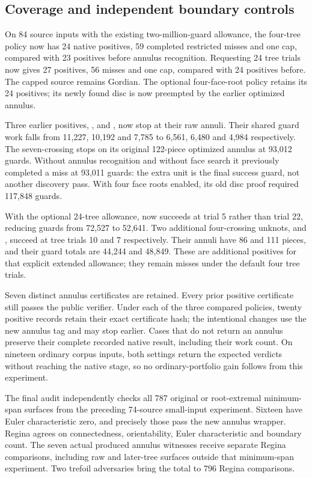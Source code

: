 \subsection{Coverage and independent boundary controls}

On 84 source inputs with the existing two-million-guard allowance, the
four-tree policy now has 24 native positives, 59 completed restricted
misses and one cap, compared with 23 positives before annulus recognition.
Requesting 24 tree trials now gives 27 positives, 56 misses and one cap,
compared with 24 positives before. The capped source remains Gordian.
The optional four-face-root policy retains its 24 positives; its newly
found disc is now preempted by the earlier optimized annulus.

Three earlier positives, ,  and
, now stop at their raw annuli. Their shared guard work
falls from 11,227, 10,192 and 7,785 to 6,561, 6,480 and 4,984 respectively.
The seven-crossing  stops on its original 122-piece
optimized annulus at 93,012 guards. Without annulus recognition and without
face search it previously completed a miss at 93,011 guards: the extra
unit is the final success guard, not another discovery pass. With four
face roots enabled, its old disc proof required 117,848 guards.

With the optional 24-tree allowance,  now succeeds at
trial 5 rather than trial 22, reducing guards from 72,527 to 52,641.
Two additional four-crossing unknots,  and
, succeed at tree trials 10 and 7 respectively. Their
annuli have 86 and 111 pieces, and their guard totals are 44,244 and 48,849.
These are additional positives for that explicit extended allowance;
they remain misses under the default four tree trials.

Seven distinct annulus certificates are retained. Every prior positive
certificate still passes the public verifier. Under each of the three
compared policies, twenty positive records retain their exact certificate
hash; the intentional changes use the new annulus tag and may stop earlier.
Cases that do not return an annulus preserve their complete recorded native
result, including their work count. On nineteen ordinary corpus inputs,
both settings return the expected verdicts without reaching the native
stage, so no ordinary-portfolio gain follows from this experiment.

The final audit independently checks all 787 original or root-extremal
minimum-span surfaces from the preceding 74-source small-input experiment.
Sixteen have Euler characteristic zero, and precisely those pass the new
annulus wrapper. Regina agrees on connectedness, orientability, Euler
characteristic and boundary count. The seven actual produced annulus
witnesses receive separate Regina comparisons, including raw and later-tree
surfaces outside that minimum-span experiment. Two trefoil adversaries
bring the total to 796 Regina comparisons.

